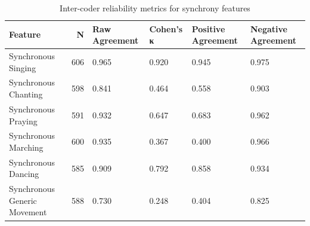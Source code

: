 \begin{table}

\caption{Inter-coder reliability metrics for synchrony features}
\centering
\begin{tabular}[t]{lrllll}
\toprule
Feature & N & Raw Agreement & Cohen's κ & Positive Agreement & Negative Agreement\\
\midrule
Synchronous Singing & 606 & 0.965 & 0.920 & 0.945 & 0.975\\
Synchronous Chanting & 598 & 0.841 & 0.464 & 0.558 & 0.903\\
Synchronous Praying & 591 & 0.932 & 0.647 & 0.683 & 0.962\\
Synchronous Marching & 600 & 0.935 & 0.367 & 0.400 & 0.966\\
Synchronous Dancing & 585 & 0.909 & 0.792 & 0.858 & 0.934\\
\addlinespace
Synchronous Generic Movement & 588 & 0.730 & 0.248 & 0.404 & 0.825\\
\bottomrule
\end{tabular}
\end{table}